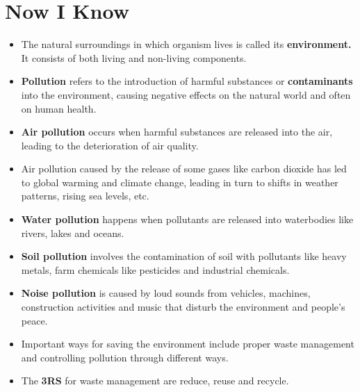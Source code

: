 \section{Now I Know}
\begin{itemize}
    \item The natural surroundings in which organism lives is called its \textbf{environment.} It consists of both living and non-living components.
    \item \textbf{Pollution} refers to the introduction of harmful substances or \textbf{contaminants} into the environment, causing negative effects on the natural world and often on human health.
    \item \textbf{Air pollution} occurs when harmful substances are released into the air, leading to the deterioration of air quality.
    \item Air pollution caused by the release of some gases like carbon dioxide has led to global warming and climate change, leading in turn to shifts in weather patterns, rising sea levels, etc.
    \item \textbf{Water pollution} happens when pollutants are released into waterbodies like rivers, lakes and oceans.
    \item \textbf{Soil pollution} involves the contamination of soil with pollutants like heavy metals, farm chemicals like pesticides and industrial chemicals.
    \item \textbf{Noise pollution} is caused by loud sounds from vehicles, machines, construction activities and music that disturb the environment and people's peace.
    \item Important ways for saving the environment include proper waste management and controlling pollution through different ways.
    \item The \textbf{3RS} for waste management are reduce, reuse and recycle.
\end{itemize}